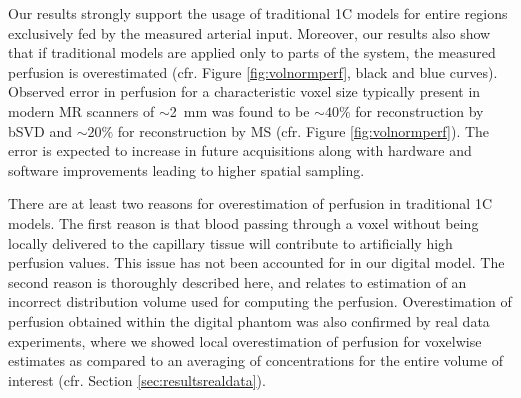 \documentclass[10pt]{article}
\begin{document}
	Our results strongly support the usage of traditional 1C models for entire regions exclusively fed by the measured arterial input. Moreover, our results also show that if traditional models are applied only to parts of the system, the measured perfusion is overestimated (cfr. Figure \ref{fig:volnormperf}, black and blue curves). Observed error in perfusion for a characteristic voxel size typically present in modern MR scanners of $\sim$\SI{2}{\milli\meter} was found to be $\sim$$40\%$ for reconstruction by bSVD and $\sim$$20\%$ for reconstruction by MS (cfr. Figure \ref{fig:volnormperf}). The error is expected to increase in future acquisitions along with hardware and software improvements leading to higher spatial sampling.
		
	There are at least two reasons for overestimation of perfusion in traditional 1C models. The first reason is that blood passing through a voxel without being locally delivered to the capillary tissue will contribute to artificially high perfusion values. This issue has not been accounted for in our digital model. The second reason is thoroughly described here, and relates to estimation of an incorrect distribution volume used for computing the perfusion. 
	Overestimation of perfusion obtained within the digital phantom was also confirmed by real data experiments, where we showed local overestimation of perfusion for voxelwise estimates as compared to an averaging of concentrations for the entire volume of interest (cfr. Section \ref{sec:resultsrealdata}). 
	
\end{document}
